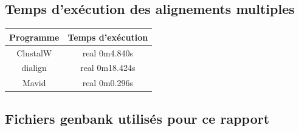 \documentclass[10.8pt]{article} %
\begin{document}
\subsection{Temps d'exécution des alignements multiples}\label{24}
\begin{tabular}{|c|c|}
 \hline
 Programme & Temps d'exécution \\
 \hline
 ClustalW & real 0m4.840s \\
 \hline
 dialign & real 0m18.424s \\
 \hline
 Mavid & real 0m0.296s\\
 \hline
\end{tabular}

\subsection{Fichiers genbank utilisés pour ce rapport}\label{25}
\end{document}
